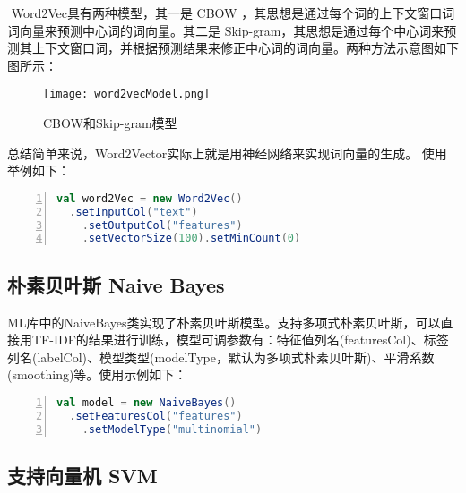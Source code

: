 \documentclass[lang=cn,11pt]{elegantpaper}
\begin{document}
​ Word2Vec具有两种模型，其一是 CBOW ，其思想是通过每个词的上下文窗口词词向量来预测中心词的词向量。其二是 Skip-gram，其思想是通过每个中心词来预测其上下文窗口词，并根据预测结果来修正中心词的词向量。两种方法示意图如下图所示：
\begin{figure}[htbp]
	\centering
	\texttt{[image: word2vecModel.png]}
	\caption{CBOW和Skip-gram模型 \label{fig:Word2VecModel}}
\end{figure}
总结简单来说，Word2Vector实际上就是用神经网络来实现词向量的生成。
使用举例如下：
\begin{lstlisting}[language={Scala},numbers=left,numberstyle=\tiny,%frame=shadowbox,  
  rulesepcolor=\color{red!20!green!20!blue!20},  
  keywordstyle=\color{blue!70!black},  
  commentstyle=\color{blue!90!},  
  basicstyle=\ttfamily]  
val word2Vec = new Word2Vec()
  .setInputCol("text")
	.setOutputCol("features")
	.setVectorSize(100).setMinCount(0)
\end{lstlisting}\par

\subsection{朴素贝叶斯 Naive Bayes}
ML库中的NaiveBayes类实现了朴素贝叶斯模型。支持多项式朴素贝叶斯，可以直接用TF-IDF的结果进行训练，模型可调参数有：特征值列名(featuresCol)、标签列名(labelCol)、模型类型(modelType，默认为多项式朴素贝叶斯)、平滑系数(smoothing)等。使用示例如下：
\begin{lstlisting}[language={Scala},numbers=left,numberstyle=\tiny,%frame=shadowbox,  
  rulesepcolor=\color{red!20!green!20!blue!20},  
  keywordstyle=\color{blue!70!black},  
  commentstyle=\color{blue!90!},  
  basicstyle=\ttfamily]  
val model = new NaiveBayes()
  .setFeaturesCol("features")
	.setModelType("multinomial")
\end{lstlisting}

\subsection{支持向量机 SVM}
\end{document}
